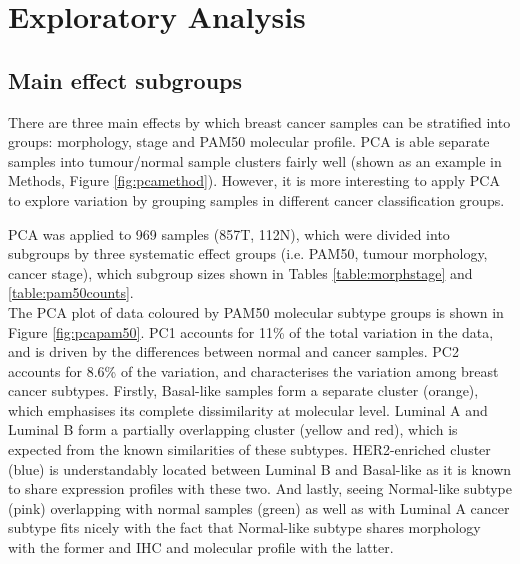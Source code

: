     
\section{Exploratory Analysis}

    
    
    

    
    

    \subsection{Main effect subgroups}

    There are three main effects by which breast cancer samples can be stratified into groups: morphology, stage and PAM50 molecular profile. PCA is able separate samples into tumour/normal sample clusters fairly well (shown as an example in Methods, Figure \ref{fig:pcamethod}). However, it is more interesting to apply PCA to explore variation by grouping samples in different cancer classification groups.  
    
    PCA was applied to 969 samples (857T, 112N), which were divided into subgroups by three systematic effect groups (i.e. PAM50, tumour morphology, cancer stage), which subgroup sizes shown in Tables \ref{table:morphstage} and \ref{table:pam50counts}. \\
    The PCA plot of data coloured by PAM50 molecular subtype groups is shown in Figure \ref{fig:pcapam50}. PC1 accounts for 11\% of the total variation in the data, and is driven by the differences between normal and cancer samples. PC2 accounts for 8.6\% of the variation, and characterises the variation among breast cancer subtypes. Firstly, Basal-like samples form a separate cluster (orange), which emphasises its complete dissimilarity at molecular level. Luminal A and Luminal B form a partially overlapping cluster (yellow and red), which is expected from the known similarities of these subtypes. HER2-enriched cluster (blue) is understandably located between Luminal B and Basal-like as it is known to share expression profiles with these two. And lastly, seeing Normal-like subtype (pink) overlapping with normal samples (green) as well as with Luminal A cancer subtype fits nicely with the fact that Normal-like subtype shares morphology with the former and IHC and molecular profile with the latter.    
    
